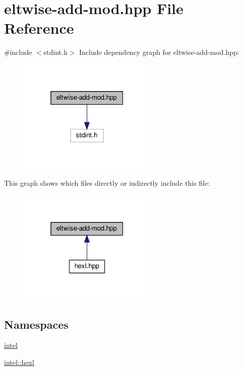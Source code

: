 \hypertarget{eltwise-add-mod_8hpp}{}\section{eltwise-\/add-\/mod.hpp File Reference}
\label{eltwise-add-mod_8hpp}
{\ttfamily \#include $<$stdint.\+h$>$}\newline
Include dependency graph for eltwise-\/add-\/mod.hpp\+:
\nopagebreak
\begin{figure}[H]
\begin{center}
\leavevmode
\includegraphics[width=187pt]{eltwise-add-mod_8hpp__incl}
\end{center}
\end{figure}
This graph shows which files directly or indirectly include this file\+:
\nopagebreak
\begin{figure}[H]
\begin{center}
\leavevmode
\includegraphics[width=187pt]{eltwise-add-mod_8hpp__dep__incl}
\end{center}
\end{figure}
\subsection*{Namespaces}
\begin{DoxyCompactItemize}
\item 
 \hyperlink{namespaceintel}{intel}
\item 
 \hyperlink{namespaceintel_1_1hexl}{intel\+::hexl}
\end{DoxyCompactItemize}
